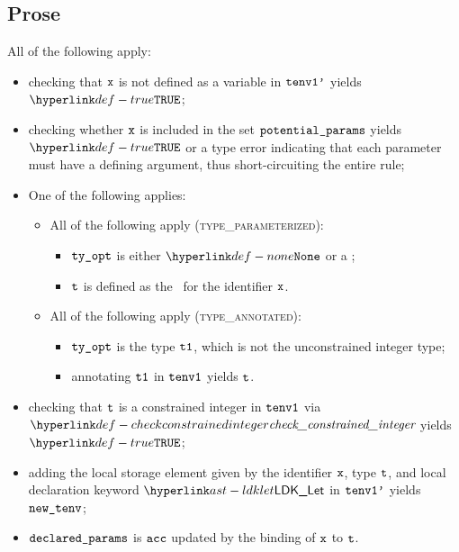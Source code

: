 \subsection{Prose}
All of the following apply:
\begin{itemize}
  \item checking that $\texttt{x}$ is not defined as a variable in $\texttt{tenv1'}$ yields $\True$\ProseOrTypeError;
  \item checking whether $\texttt{x}$ is included in the set $\texttt{potential\_params}$ yields $\True$ or a type error
        indicating that each parameter must have a defining argument, thus short-circuiting the entire rule;
  \item One of the following applies:
  \begin{itemize}
    \item All of the following apply (\textsc{type\_parameterized}):
    \begin{itemize}
      \item $\texttt{ty\_opt}$ is either $\None$ or a \parameterizedintegertype;
      \item $\texttt{t}$ is defined as the \parameterizedintegertype\ for the identifier $\texttt{x}$.
    \end{itemize}

    \item All of the following apply (\textsc{type\_annotated}):
    \begin{itemize}
      \item $\texttt{ty\_opt}$ is the type $\texttt{t1}$, which is not the unconstrained integer type;
      \item annotating $\texttt{t1}$ in $\texttt{tenv1}$ yields $\texttt{t}$\ProseOrTypeError.
    \end{itemize}
  \end{itemize}
  \item checking that $\texttt{t}$ is a constrained integer in $\texttt{tenv1}$ via $\checkconstrainedinteger$
        yields $\True$\ProseOrTypeError;
  \item adding the local storage element given by the identifier $\texttt{x}$, type $\texttt{t}$, and local declaration keyword
        $\LDKLet$ in $\texttt{tenv1'}$ yields $\texttt{new\_tenv}$;
  \item $\texttt{declared\_params}$ is $\texttt{acc}$ updated by the binding of $\texttt{x}$ to $\texttt{t}$.
\end{itemize}

